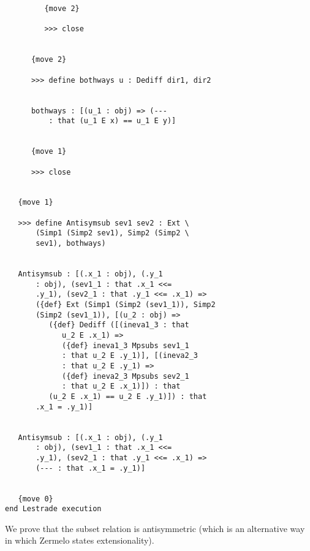 \documentclass[12pt]{article}
\begin{document}
\begin{verbatim}
         {move 2}

         >>> close


      {move 2}

      >>> define bothways u : Dediff dir1, dir2


      bothways : [(u_1 : obj) => (--- 
          : that (u_1 E x) == u_1 E y)]


      {move 1}

      >>> close


   {move 1}

   >>> define Antisymsub sev1 sev2 : Ext \
       (Simp1 (Simp2 sev1), Simp2 (Simp2 \
       sev1), bothways)


   Antisymsub : [(.x_1 : obj), (.y_1 
       : obj), (sev1_1 : that .x_1 <<= 
       .y_1), (sev2_1 : that .y_1 <<= .x_1) => 
       ({def} Ext (Simp1 (Simp2 (sev1_1)), Simp2 
       (Simp2 (sev1_1)), [(u_2 : obj) => 
          ({def} Dediff ([(ineva1_3 : that 
             u_2 E .x_1) => 
             ({def} ineva1_3 Mpsubs sev1_1 
             : that u_2 E .y_1)], [(ineva2_3 
             : that u_2 E .y_1) => 
             ({def} ineva2_3 Mpsubs sev2_1 
             : that u_2 E .x_1)]) : that 
          (u_2 E .x_1) == u_2 E .y_1)]) : that 
       .x_1 = .y_1)]


   Antisymsub : [(.x_1 : obj), (.y_1 
       : obj), (sev1_1 : that .x_1 <<= 
       .y_1), (sev2_1 : that .y_1 <<= .x_1) => 
       (--- : that .x_1 = .y_1)]


   {move 0}
end Lestrade execution
\end{verbatim}

We prove that the subset relation is antisymmetric (which is an alternative way in which Zermelo states extensionality).
\end{document}
